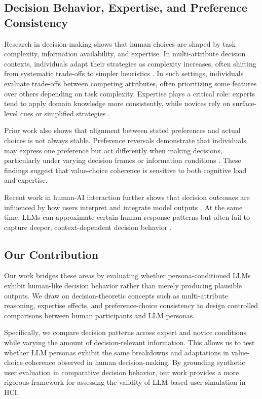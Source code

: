 \documentclass{sigchi-ext}
\begin{document}
\subsection{Decision Behavior, Expertise, and Preference Consistency}

Research in decision-making shows that human choices are shaped by task complexity, information availability, and expertise. In multi-attribute decision contexts, individuals adapt their strategies as complexity increases, often shifting from systematic trade-offs to simpler heuristics \cite{payne1993adaptive}. In such settings, individuals evaluate trade-offs between competing attributes, often prioritizing some features over others depending on task complexity. Expertise plays a critical role: experts tend to apply domain knowledge more consistently, while novices rely on surface-level cues or simplified strategies \cite{chi1988nature, shanteau1992competence}.

Prior work also shows that alignment between stated preferences and actual choices is not always stable. Preference reversals demonstrate that individuals may express one preference but act differently when making decisions, particularly under varying decision frames or information conditions \cite{slovic1983preference}. These findings suggest that value-choice coherence is sensitive to both cognitive load and expertise.

Recent work in human-AI interaction further shows that decision outcomes are influenced by how users interpret and integrate model outputs \cite{bansal2021does}. At the same time, LLMs can approximate certain human response patterns but often fail to capture deeper, context-dependent decision behavior \cite{argyle2023out}.

\subsection{Our Contribution}

Our work bridges these areas by evaluating whether persona-conditioned LLMs exhibit human-like decision behavior rather than merely producing plausible outputs. We draw on decision-theoretic concepts such as multi-attribute reasoning, expertise effects, and preference-choice consistency to design controlled comparisons between human participants and LLM personas.

Specifically, we compare decision patterns across expert and novice conditions while varying the amount of decision-relevant information. This allows us to test whether LLM personas exhibit the same breakdowns and adaptations in value-choice coherence observed in human decision-making. By grounding synthetic user evaluation in comparative decision behavior, our work provides a more rigorous framework for assessing the validity of LLM-based user simulation in HCI.
\end{document}
